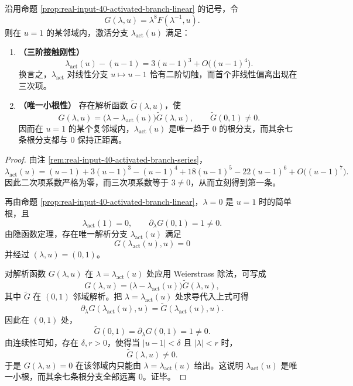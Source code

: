 \begin{theorem}[激活分支的三阶接触刚性与唯一小根性]\label{thm:xi-output-potential-activated-branch-rigidity}
沿用命题 \ref{prop:real-input-40-activated-branch-linear} 的记号，令
\[
G(\lambda,u)=\lambda^8F(\lambda^{-1},u).
\]
则在 \(u=1\) 的某邻域内，激活分支 \(\lambda_{\mathrm{act}}(u)\) 满足：
\begin{enumerate}
  \item \textbf{（三阶接触刚性）}
  \[
  \boxed{\;
  \lambda_{\mathrm{act}}(u)-(u-1)=3(u-1)^3+O\!\bigl((u-1)^4\bigr).
  \;}
  \]
  换言之，\(\lambda_{\mathrm{act}}\) 对线性分支 \(u\mapsto u-1\) 恰有二阶切触，而首个非线性偏离出现在三次项。
  \item \textbf{（唯一小根性）} 存在解析函数 \(\widetilde G(\lambda,u)\)，使
  \[
  G(\lambda,u)=\bigl(\lambda-\lambda_{\mathrm{act}}(u)\bigr)\widetilde G(\lambda,u),
  \qquad
  \widetilde G(0,1)\neq 0.
  \]
  因而在 \(u=1\) 的某个复邻域内，\(\lambda_{\mathrm{act}}(u)\) 是唯一趋于 \(0\) 的根分支，而其余七条根分支都与 \(0\) 保持正距离。
\end{enumerate}
\end{theorem}
\begin{proof}
由注 \ref{rem:real-input-40-activated-branch-series}，
\[
\lambda_{\mathrm{act}}(u)
=(u-1)+3(u-1)^3-(u-1)^4+18(u-1)^5-22(u-1)^6
+O\!\bigl((u-1)^7\bigr).
\]
因此二次项系数严格为零，而三次项系数等于 \(3\neq 0\)，从而立刻得到第一条。

再由命题 \ref{prop:real-input-40-activated-branch-linear}，\(\lambda=0\) 是 \(u=1\) 时的简单根，且
\[
\lambda_{\mathrm{act}}(1)=0,
\qquad
\partial_\lambda G(0,1)=1\neq 0.
\]
由隐函数定理，存在唯一解析分支 \(\lambda_{\mathrm{act}}(u)\) 满足
\[
G(\lambda_{\mathrm{act}}(u),u)=0
\]
并经过 \((\lambda,u)=(0,1)\)。

对解析函数 \(G(\lambda,u)\) 在 \(\lambda=\lambda_{\mathrm{act}}(u)\) 处应用 Weierstrass 除法，可写成
\[
G(\lambda,u)=\bigl(\lambda-\lambda_{\mathrm{act}}(u)\bigr)\widetilde G(\lambda,u),
\]
其中 \(\widetilde G\) 在 \((0,1)\) 邻域解析。把 \(\lambda=\lambda_{\mathrm{act}}(u)\) 处求导代入上式可得
\[
\partial_\lambda G(\lambda_{\mathrm{act}}(u),u)=\widetilde G(\lambda_{\mathrm{act}}(u),u).
\]
因此在 \((0,1)\) 处，
\[
\widetilde G(0,1)=\partial_\lambda G(0,1)=1\neq 0.
\]
由连续性可知，存在 \(\delta,r>0\)，使得当 \(|u-1|<\delta\) 且 \(|\lambda|<r\) 时，
\[
\widetilde G(\lambda,u)\neq 0.
\]
于是 \(G(\lambda,u)=0\) 在该邻域内只能由
\(
\lambda=\lambda_{\mathrm{act}}(u)
\)
给出。这说明 \(\lambda_{\mathrm{act}}(u)\) 是唯一小根，而其余七条根分支全部远离 \(0\)。证毕。
\end{proof}

